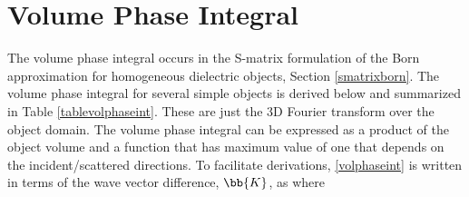 \section{Volume Phase Integral}
\label{sec:volumephaseint}
The volume phase integral occurs in the S-matrix formulation of the  Born approximation for homogeneous dielectric objects, Section \ref{smatrixborn}.  The volume phase integral for several simple objects is derived below and summarized in Table \ref{tablevolphaseint}. These are just the 3D Fourier transform over the object domain. The volume phase integral can be expressed as a product of the object volume and a function that has maximum value of one that depends on the incident/scattered directions. To facilitate derivations, \eqref{volphaseint} is written in terms of the wave vector difference, $\bb{K}$, as 
\noindent where
\vspace{-7mm}


